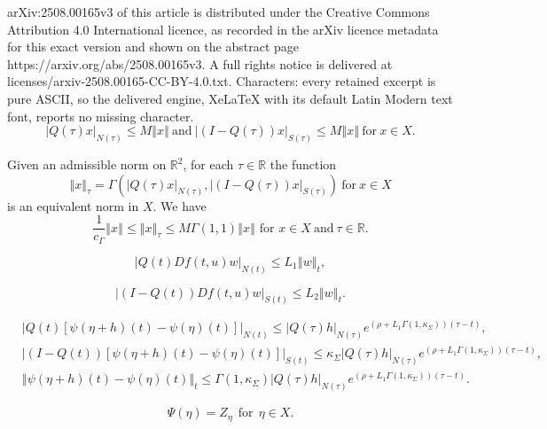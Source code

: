 \documentclass[10pt,a4paper]{amsart}
\newcommand{\R}{\mathbb{R}}
\newcommand{\norm}[1]{\left\Vert#1\right\Vert}
\renewcommand{\leq}{\leqslant}
\begin{document}
arXiv:2508.00165v3 of this article is distributed under the Creative Commons Attribution 4.0 International licence, as recorded in the arXiv licence metadata for this exact version and shown on the abstract page https://arxiv.org/abs/2508.00165v3. A full rights notice is delivered at licenses/arxiv-2508.00165-CC-BY-4.0.txt. Characters: every retained excerpt is pure ASCII, so the delivered engine, XeLaTeX with its default Latin Modern text font, reports no missing character.
\begin{equation}\label{e:QI-QONX}
|Q(\tau)x|_{N(\tau)}\leq M\norm{x}\ \text{and}\  |(I-Q(\tau))x|_{S(\tau)}\leq M\norm{x}\ \text{for}\  x\in X.
\end{equation}

\begin{lem}\label{lem:EQUIVNORMS}
Given an admissible norm on $\R^2$, for each $\tau\in\R$ the function
\begin{equation}\label{e:MOVINGNORM}
\norm{x}_\tau=\Gamma\left(|Q(\tau)x|_{N(\tau)},|(I-Q(\tau))x|_{S(\tau)}\right)\ \text{for}\ x\in X
\end{equation}
is an equivalent norm in $X$. We have 
$$\frac{1}{c_{\Gamma}}\norm{x}\leq\norm{x}_{\tau}\leq M\Gamma(1,1)\norm{x}\text{  for }x\in X\ \text{and}\ \tau\in\R.$$
\end{lem}

\begin{equation}\label{e:L1DF}
	|Q(t)Df(t,u)w|_{N(t)}\leq L_1\norm{w}_{t},
\end{equation}

\begin{equation}\label{e:L2DF}
	|(I-Q(t))Df(t,u)w|_{S(t)}\leq L_2\norm{w}_{t}.
\end{equation}

\begin{align}\label{e:PSIONNT}
&|Q(t)[\psi(\eta+h)(t)-\psi(\eta)(t)]|_{N(t)}\leq|Q(\tau)h|_{N(\tau)}e^{(\rho+L_1\Gamma(1,\kappa_\Sigma))(\tau-t)},\\
&\label{e:PSIONST}
|(I-Q(t))[\psi(\eta+h)(t)-\psi(\eta)(t)]|_{S(t)}\leq\kappa_\Sigma|Q(\tau)h|_{N(\tau)}e^{(\rho+L_1\Gamma(1,\kappa_\Sigma))(\tau-t)},\\
&\label{e:CONTINUITYPSIT}
\norm{\psi(\eta+h)(t)-\psi(\eta)(t)}_{t}\leq\Gamma\left(1,\kappa_\Sigma\right)|Q(\tau)h|_{N(\tau)}e^{(\rho+L_1\Gamma(1,\kappa_\Sigma))(\tau-t)}.
\end{align}

\begin{equation}\label{e:DEFPSI}
\Psi(\eta)=Z_{\eta}\ \ \text{for}\ \ \eta\in X.
\end{equation}
\end{document}

